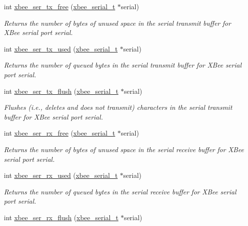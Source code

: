 \begin{DoxyCompactItemize}
int \hyperlink{group__hal__posix_ga3ad8f378b572d6fec982f1086bd3b94f}{xbee\+\_\+ser\+\_\+tx\+\_\+free} (\hyperlink{structxbee__serial__t}{xbee\+\_\+serial\+\_\+t} $\ast$serial)
\begin{DoxyCompactList}\small\item\em Returns the number of bytes of unused space in the serial transmit buffer for X\+Bee serial port {\itshape serial}. \end{DoxyCompactList}\item 
int \hyperlink{group__hal__posix_gaabf70934d186354cde4ac14ed27d1bd2}{xbee\+\_\+ser\+\_\+tx\+\_\+used} (\hyperlink{structxbee__serial__t}{xbee\+\_\+serial\+\_\+t} $\ast$serial)
\begin{DoxyCompactList}\small\item\em Returns the number of queued bytes in the serial transmit buffer for X\+Bee serial port {\itshape serial}. \end{DoxyCompactList}\item 
int \hyperlink{group__hal__posix_ga05308d37301d27715f1e1308b7189220}{xbee\+\_\+ser\+\_\+tx\+\_\+flush} (\hyperlink{structxbee__serial__t}{xbee\+\_\+serial\+\_\+t} $\ast$serial)
\begin{DoxyCompactList}\small\item\em Flushes (i.\+e., deletes and does not transmit) characters in the serial transmit buffer for X\+Bee serial port {\itshape serial}. \end{DoxyCompactList}\item 
int \hyperlink{group__hal__posix_ga16fb431a1e66861439518e562431821f}{xbee\+\_\+ser\+\_\+rx\+\_\+free} (\hyperlink{structxbee__serial__t}{xbee\+\_\+serial\+\_\+t} $\ast$serial)
\begin{DoxyCompactList}\small\item\em Returns the number of bytes of unused space in the serial receive buffer for X\+Bee serial port {\itshape serial}. \end{DoxyCompactList}\item 
int \hyperlink{group__hal__posix_ga43b8322771cc16b4130fa5330ad2242b}{xbee\+\_\+ser\+\_\+rx\+\_\+used} (\hyperlink{structxbee__serial__t}{xbee\+\_\+serial\+\_\+t} $\ast$serial)
\begin{DoxyCompactList}\small\item\em Returns the number of queued bytes in the serial receive buffer for X\+Bee serial port {\itshape serial}. \end{DoxyCompactList}\item 
int \hyperlink{group__hal__posix_ga98a6d5ceb5e1445e8ef82ccaa65a8c15}{xbee\+\_\+ser\+\_\+rx\+\_\+flush} (\hyperlink{structxbee__serial__t}{xbee\+\_\+serial\+\_\+t} $\ast$serial)

\end{DoxyCompactItemize}
